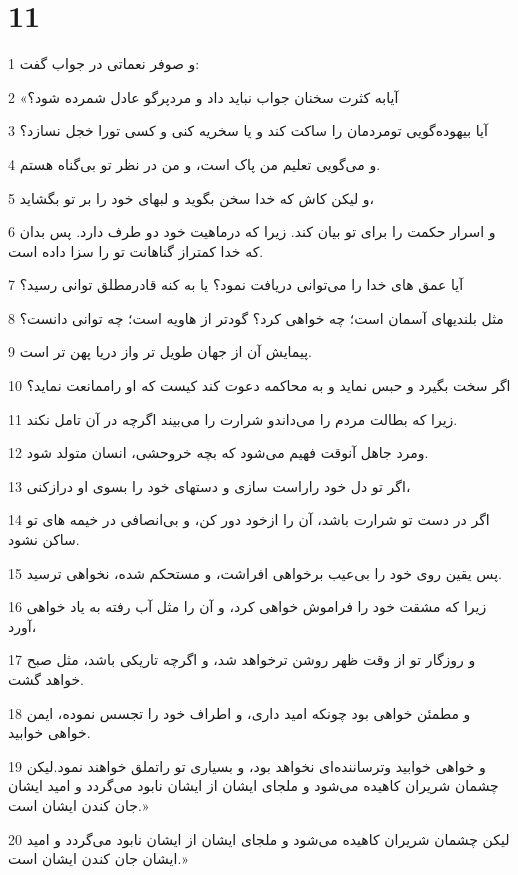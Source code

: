 \chapter{11}

\par 1 و صوفر نعماتی در جواب گفت:
\par 2 «آیابه کثرت سخنان جواب نباید داد و مردپرگو عادل شمرده شود؟
\par 3 آیا بیهوده‌گویی تومردمان را ساکت کند و یا سخریه کنی و کسی تورا خجل نسازد؟
\par 4 و می‌گویی تعلیم من پاک است، و من در نظر تو بی‌گناه هستم.
\par 5 و لیکن کاش که خدا سخن بگوید و لبهای خود را بر تو بگشاید،
\par 6 و اسرار حکمت را برای تو بیان کند. زیرا که درماهیت خود دو طرف دارد. پس بدان که خدا کمتراز گناهانت تو را سزا داده است.
\par 7 آیا عمق های خدا را می‌توانی دریافت نمود؟ یا به کنه قادرمطلق توانی رسید؟
\par 8 مثل بلندیهای آسمان است؛ چه خواهی کرد؟ گودتر از هاویه است؛ چه توانی دانست؟
\par 9 پیمایش آن از جهان طویل تر واز دریا پهن تر است.
\par 10 اگر سخت بگیرد و حبس نماید و به محاکمه دعوت کند کیست که او راممانعت نماید؟
\par 11 زیرا که بطالت مردم را می‌داندو شرارت را می‌بیند اگرچه در آن تامل نکند.
\par 12 ومرد جاهل آنوقت فهیم می‌شود که بچه خروحشی، انسان متولد شود.
\par 13 اگر تو دل خود راراست سازی و دستهای خود را بسوی او درازکنی،
\par 14 اگر در دست تو شرارت باشد، آن را ازخود دور کن، و بی‌انصافی در خیمه های تو ساکن نشود.
\par 15 پس یقین روی خود را بی‌عیب برخواهی افراشت، و مستحکم شده، نخواهی ترسید.
\par 16 زیرا که مشقت خود را فراموش خواهی کرد، و آن را مثل آب رفته به یاد خواهی آورد،
\par 17 و روزگار تو از وقت ظهر روشن ترخواهد شد، و اگرچه تاریکی باشد، مثل صبح خواهد گشت.
\par 18 و مطمئن خواهی بود چونکه امید داری، و اطراف خود را تجسس نموده، ایمن خواهی خوابید.
\par 19 و خواهی خوابید وترساننده‌ای نخواهد بود، و بسیاری تو راتملق خواهند نمود.لیکن چشمان شریران کاهیده می‌شود و ملجای ایشان از ایشان نابود می‌گردد و امید ایشان جان کندن ایشان است.»
\par 20 لیکن چشمان شریران کاهیده می‌شود و ملجای ایشان از ایشان نابود می‌گردد و امید ایشان جان کندن ایشان است.»
 
